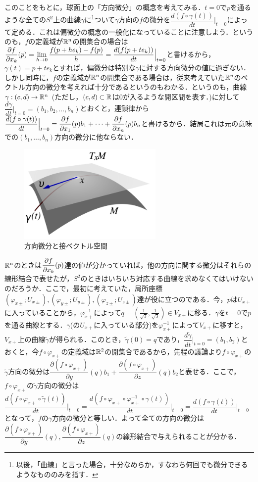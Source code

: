 このことをもとに，球面上の「方向微分」の概念を考えてみる．$t=0$で$p$を通るような全ての$S^2$上の曲線$\gamma$に\footnote{以後，「曲線」と言った場合，十分なめらか，すなわち何回でも微分できるようなもののみを指す．}ついて$\gamma$方向の$f$の微分を$\dfrac{d(f\circ\gamma(t))}{dt}\Big|_{t=0}$によって定める．これは偏微分の概念の一般化になっていることに注意しよう．というのも，$f$の定義域が${\mathbb R}^n$の開集合の場合は$\displaystyle\frac{\partial f}{\partial x_k}(p)=\lim_{h\rightarrow 0}\displaystyle\frac{f(p+he_k)-f(p)}{h}=\displaystyle\frac{d(f(p+te_k))}{dt}\Big|_{t=0}$と書けるから，$\gamma(t)=p+te_k$とすれば，偏微分は特別な$\gamma$に対する方向微分の値に過ぎない．しかし同時に，$f$の定義域が${\mathbb R}^n$の開集合である場合は，従来考えていた${\mathbb R}^n$のベクトル方向の微分を考えれば十分であるというのもわかる．というのも，曲線$\gamma:(c,d)\rightarrow {\mathbb R}^n$ (ただし，$(c,d)\subset{\mathbb R}$は0が入るような開区間を表す．)に対して$\dfrac{d\gamma}{dt}\Big|_{t=0}=(b_1,b_2,\dots,b_n)$とおくと，連鎖律から$\displaystyle\frac{d(f\circ\gamma(t))}{dt}\Big|_{t=0}=\displaystyle\frac{\partial f}{\partial x_1}(p) b_1+\dots+\displaystyle\frac{\partial f}{\partial x_n}(p) b_n$と書けるから．結局これは元の意味での$(b_1,\dots,b_n)$方向の微分に他ならない．
\begin{figure}[h]
  \begin{center} 
    \includegraphics[width=7.0cm]{dev_tangentvec}
    \caption{方向微分と接ベクトル空間}
  \end{center}
\end{figure}


${\mathbb R}^n$のときは$\displaystyle\frac{\partial f}{\partial x_k}(p)$達の値が分かっていれば，他の方向に関する微分はそれらの線形結合で表せたが，$S^2$のときはいちいち対応する曲線を求めなくてはいけないのだろうか．ここで，最初に考えていた，局所座標$(\varphi_{x\pm};U_{x\pm}),(\varphi_{y\pm};U_{y\pm}),(\varphi_{z\pm};U_{z\pm})$達が役に立つのである．今，$p$は$U_{x+}$に入っていることから，$\varphi_{x+}^{-1}$によって$q=(\frac{1}{\sqrt{3}},\frac{1}{\sqrt{3}})\in V_{x+}$に移る．$\gamma$を$t=0$で$p$を通る曲線とする．$\gamma$(の$U_{x+}$に入っている部分)を$\varphi_{x+}^{-1}$によって$V_{x+}$に移すと，$V_{x+}$上の曲線$\tilde{\gamma}$が得られる．このとき，$\tilde{\gamma}(0)=q$であり，$\dfrac{d\tilde{\gamma}}{dt}\Big|_{t=0}=(b_1,b_2)$とおくと，今$f\circ \varphi_{x+}$の定義域は${\mathbb R}^2$の開集合であるから，先程の議論より$f\circ\varphi_{x+}$の$\tilde{\gamma}$方向の微分は$\dfrac{\partial (f\circ\varphi_{x+})}{\partial y}(q)b_1+\dfrac{\partial (f\circ\varphi_{x+})}{\partial z}(q)b_2$と表せる．ここで，$f\circ \varphi_{x+}$の$\tilde{\gamma}$方向の微分は$\dfrac{d(f\circ\varphi_{x+}\circ\tilde{\gamma}(t))}{dt}\Big|_{t=0}=\dfrac{d(f\circ\varphi_{x+}\circ\varphi_{x+}^{-1}\circ\gamma(t))}{dt}\Big|_{t=0}=\dfrac{d(f\circ\gamma(t))}{dt}\Big|_{t=0}$となって，$f$の$\gamma$方向の微分と等しい．よって全ての方向の微分は$\dfrac{\partial (f\circ\varphi_{x+})}{\partial y}(q),\dfrac{\partial (f\circ\varphi_{x+})}{\partial z}(q)$の線形結合で与えられることが分かる．


